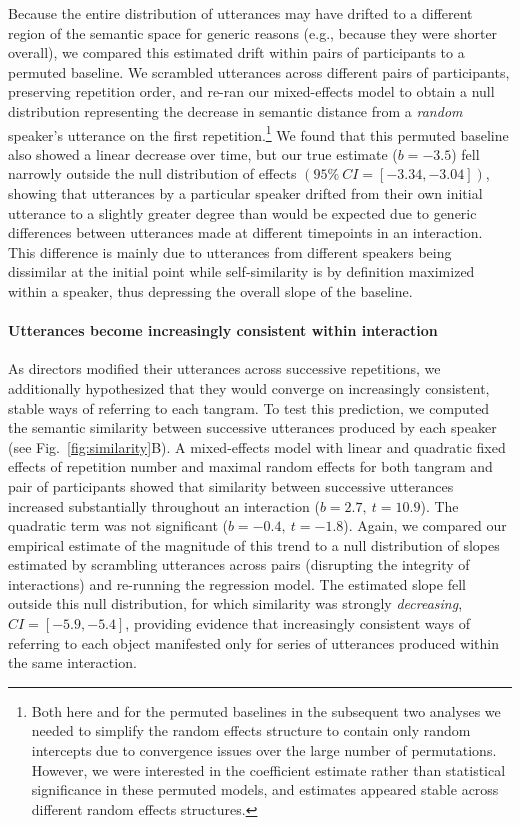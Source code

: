 \documentclass[alpha-refs]{wiley-article}
\begin{document}
Because the entire distribution of utterances may have drifted to a different region of the semantic space for generic reasons (e.g., because they were shorter overall), we compared this estimated drift within pairs of participants to a permuted baseline.
We scrambled utterances across different pairs of participants, preserving repetition order, and re-ran our mixed-effects model to obtain a null distribution representing the decrease in semantic distance from a \emph{random} speaker's utterance on the first repetition.\footnote{Both here and for the permuted baselines in the subsequent two analyses we needed to simplify the random effects structure to contain only random intercepts due to convergence issues over the large number of permutations. However, we were interested in the coefficient estimate rather than statistical significance in these permuted models, and estimates appeared stable across different random effects structures.}
We found that this permuted baseline also showed a linear decrease over time, but our true estimate ($b=-3.5$) fell narrowly outside the null distribution of effects $(95\%~CI= [-3.34, -3.04])$, showing that utterances by a particular speaker drifted from their own initial utterance to a slightly greater degree than would be expected due to generic differences between utterances made at different timepoints in an interaction.
This difference is mainly due to utterances from different speakers being dissimilar at the initial point while self-similarity is by definition maximized within a speaker, thus depressing the overall slope of the baseline.

\paragraph{Utterances become increasingly consistent within interaction} 
As directors modified their utterances across successive repetitions, we additionally hypothesized that they would converge on increasingly consistent, stable ways of referring to each tangram.
To test this prediction, we computed the semantic similarity between successive utterances produced by each speaker (see Fig.~\ref{fig:similarity}B). %
A mixed-effects model with linear and quadratic fixed effects of repetition number and maximal random effects for both tangram and pair of participants showed that similarity between successive utterances increased substantially throughout an interaction ($b = 2.7,~t = 10.9$). 
The quadratic term was not significant ($b= -0.4,~t=-1.8$).
Again, we compared our empirical estimate of the magnitude of this trend to a null distribution of slopes estimated by scrambling utterances across pairs (disrupting the integrity of interactions) and re-running the regression model. 
The estimated slope fell outside this null distribution, for which similarity was strongly \emph{decreasing}, $CI = [-5.9, -5.4]$, providing evidence that increasingly consistent ways of referring to each object manifested only for series of utterances produced within the same interaction.
\end{document}
